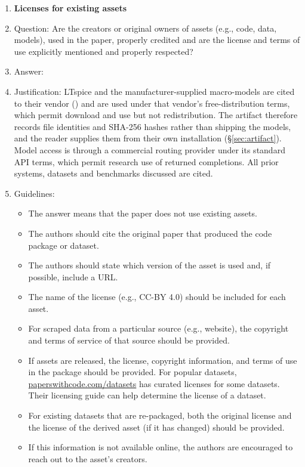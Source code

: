 \begin{enumerate}
\item {\bf Licenses for existing assets}
    \item[] Question: Are the creators or original owners of assets (e.g., code, data, models), used in the paper, properly credited and are the license and terms of use explicitly mentioned and properly respected?
        \item[] Answer: \answerYes{}
    \item[] Justification: LTspice and the manufacturer-supplied macro-models
    are cited to their vendor (\cite{b16}) and are used under that vendor's
    free-distribution terms, which permit download and use but not
    redistribution. The artifact therefore records file identities and SHA-256
    hashes rather than shipping the models, and the reader supplies them from
    their own installation (\S\ref{sec:artifact}). Model access is through a
    commercial routing provider under its standard API terms, which permit
    research use of returned completions. All prior systems, datasets and
    benchmarks discussed are cited.
    \item[] Guidelines:
    \begin{itemize}
        \item The answer \answerNA{} means that the paper does not use existing assets.
        \item The authors should cite the original paper that produced the code package or dataset.
        \item The authors should state which version of the asset is used and, if possible, include a URL.
        \item The name of the license (e.g., CC-BY 4.0) should be included for each asset.
        \item For scraped data from a particular source (e.g., website), the copyright and terms of service of that source should be provided.
        \item If assets are released, the license, copyright information, and terms of use in the package should be provided. For popular datasets, \url{paperswithcode.com/datasets} has curated licenses for some datasets. Their licensing guide can help determine the license of a dataset.
        \item For existing datasets that are re-packaged, both the original license and the license of the derived asset (if it has changed) should be provided.
        \item If this information is not available online, the authors are encouraged to reach out to the asset's creators.
    \end{itemize}


\end{enumerate}
